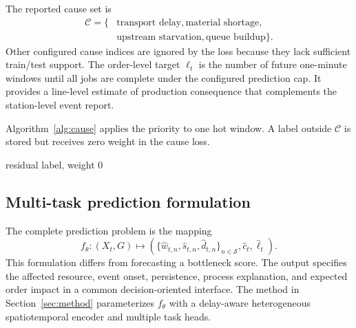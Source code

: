 \documentclass[a4paper,fleqn]{cas-dc}
\begin{document}
The reported cause set is
\begin{equation}
\begin{aligned}
\mathcal{C}=\{&
\text{transport delay},\text{material shortage},\\
&\text{upstream starvation},\text{queue buildup}\}.
\end{aligned}
\end{equation}
Other configured cause indices are ignored by the loss because they lack sufficient train/test support. The order-level target $\ell_t$ is the number of future one-minute windows until all jobs are complete under the configured prediction cap. It provides a line-level estimate of production consequence that complements the station-level event report.


Algorithm~\ref{alg:cause} applies the priority to one hot window. A label outside $\mathcal{C}$ is stored but receives zero weight in the cause loss.


\begin{algorithm}[t]
\caption{Cause assignment.}
\label{alg:cause}
\Return residual label, weight $0$\;
\end{algorithm}

\subsection{Multi-task prediction formulation}

The complete prediction problem is the mapping
\begin{equation}
f_{\theta}:(X_t,G)\longmapsto
\left(
\{\hat w_{t,n},\hat s_{t,n},\hat d_{t,n}\}_{n\in\mathcal{S}},
\hat c_t,\hat\ell_t
\right).
\end{equation}
This formulation differs from forecasting a bottleneck score. The output specifies the affected resource, event onset, persistence, process explanation, and expected order impact in a common decision-oriented interface. The method in Section~\ref{sec:method} parameterizes $f_{\theta}$ with a delay-aware heterogeneous spatiotemporal encoder and multiple task heads.
\end{document}
